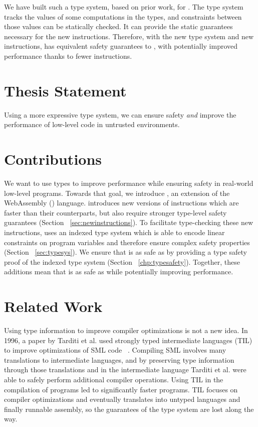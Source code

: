 We have built such a type system, based on prior work, for \name.
The \name type system tracks the values of some computations in the types, and constraints between those values can be statically checked.
It can provide the static guarantees necessary for the new \name instructions.
Therefore, with the new type system and new instructions, \name has equivalent safety guarantees to \wasm, with potentially improved performance thanks to fewer instructions.

\section{Thesis Statement}
\begin{adjustwidth}{1cm}{1cm}
    Using a more expressive type system, we can ensure safety \emph{and} improve the performance of low-level code in untrusted environments.
\end{adjustwidth}

\section{Contributions}
We want to use types to improve performance while ensuring safety in real-world low-level programs.
Towards that goal, we introduce \name, an extension of the WebAssembly (\wasm) language.
\name introduces new versions of \wasm instructions which are faster than their \wasm counterparts, but also require stronger type-level safety guarantees (Section ~\ref{sec:newinstructions}).
To facilitate type-checking these new instructions, \name uses an indexed type system which is able to encode linear constraints on program variables and therefore ensure complex safety properties (Section ~\ref{sec:typesys}).
We ensure that \name is as safe as \wasm by providing a type safety proof of the \name indexed type system (Section ~\ref{chp:typesafety}).
Together, these additions mean that \name is as safe as \wasm while potentially improving performance.

\section{Related Work}
\label{sec:relwork}
Using type information to improve compiler optimizations is not a new idea.
In 1996, a paper by Tarditi et al. used strongly typed intermediate languages (TIL) to improve optimizations of SML code ~\cite{TIL}.
Compiling SML involves many translations to intermediate languages, and by preserving type information through those translations and in the intermediate language Tarditi et al. were able to safely perform additional compiler operations.
Using TIL in the compilation of programs led to significantly faster programs.
TIL focuses on compiler optimizations and eventually translates into untyped languages and finally runnable assembly, so the guarantees of the type system are lost along the way.

